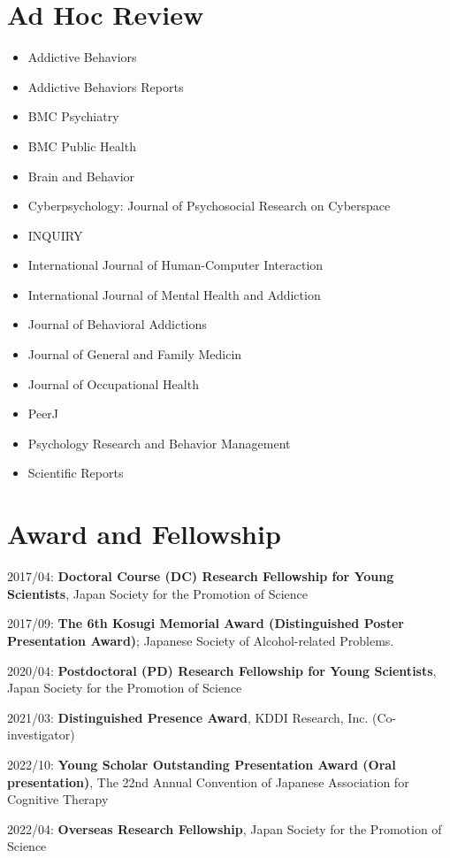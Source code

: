 \documentclass[a4paper]{article}
\begin{document}
\section{Ad Hoc Review}
\begin{itemize}
	\item Addictive Behaviors
	\item Addictive Behaviors Reports
	\item BMC Psychiatry
	\item BMC Public Health
	\item Brain and Behavior
	\item Cyberpsychology: Journal of Psychosocial Research on Cyberspace 
	\item INQUIRY
	\item International Journal of Human-Computer Interaction
	\item International Journal of Mental Health and Addiction
	\item Journal of Behavioral Addictions
	\item Journal of General and Family Medicin
	\item Journal of Occupational Health
	\item PeerJ
	\item Psychology Research and Behavior Management 
	\item Scientific Reports
\end{itemize}

\section{Award and Fellowship}
	\begin{description}
		\item 2017/04: \textbf{Doctoral Course (DC) Research Fellowship for Young Scientists}, Japan Society for the Promotion of Science
		\item 2017/09: \textbf{The 6th Kosugi Memorial Award (Distinguished Poster Presentation Award)}; Japanese Society of Alcohol-related Problems.
		\item 2020/04: \textbf{Postdoctoral (PD) Research Fellowship for Young Scientists}, Japan Society for the Promotion of Science
		\item 2021/03: \textbf{Distinguished Presence Award}, KDDI Research, Inc. (Co-investigator)
		\item 2022/10: \textbf{Young Scholar Outstanding Presentation Award (Oral presentation)}, The 22nd Annual Convention of Japanese Association for Cognitive Therapy
		\item 2022/04: \textbf{Overseas Research Fellowship}, Japan Society for the Promotion of Science
	\end{description}
	
\end{document}
